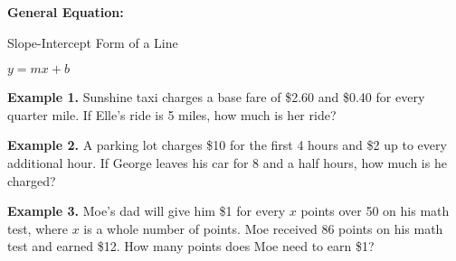 \bigskip
\textbf{General Equation:}

\begin{center}
Slope-Intercept Form of a Line

$y=mx+b$
\end{center}

\vfill
\textbf{Example 1.} Sunshine taxi charges a base fare of \$2.60 and \$0.40 for every quarter mile. If Elle's ride is 5 miles, how much is her ride?

\vfill
\textbf{Example 2.} A parking lot charges \$10 for the first 4 hours and \$2 up to every additional hour. If George leaves his car for 8 and a half hours, how much is he charged?

\vfill
\textbf{Example 3.} Moe's dad will give him \$1 for every $x$ points over 50 on his math test, where $x$ is a whole number of points. Moe received 86 points on his math test and earned \$12. How many points does Moe need to earn \$1?

